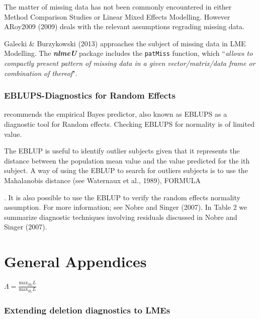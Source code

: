 \documentclass[12pt, a4paper]{report}
\theoremstyle{plain}
\theoremstyle{definition}
\theoremstyle{remark}
\begin{document}
	The matter of missing data has not been commonly encountered in either Method Comparison Studies or Linear Mixed Effects Modelling. However ARoy2009 (2009) deals with the relevant assumptions regrading missing data. 
	
	Galecki \& Burzykowski (2013) approaches the subject of missing data in LME Modelling. The \textbf{\textit{nlmeU}} package includes the \texttt{patMiss} function, which ``\textit{allows to compactly present pattern of missing data in a given vector/matrix/data
		frame or combination of thereof}".
	
	
	
\subsection{EBLUPS-Diagnostics for Random Effects}
\citet{west} recommends the empirical Bayes predictor, also known as EBLUPS as a diagnostic tool for Random effects. Checking EBLUPS for normality is of limited value.




The EBLUP is useful to identify outlier subjects given that it represents the distance
between the population mean value and the value predicted for the ith subject. A way of
using the EBLUP to search for outliers subjects is to use the Mahalanobis distance (see
Waternaux et al., 1989), FORMULA

. It is also possible to use the EBLUP
to verify the random effects normality assumption. For more information; see Nobre and
Singer (2007). In Table 2 we summarize diagnostic techniques involving residuals discussed
in Nobre and Singer (2007).




	\chapter{General Appendices}
	$\Lambda = \frac{\mbox{max}_{H_{0}}L}{\mbox{max}_{H_{1}}L}$
	
	\subsection{Extending deletion diagnostics to LMEs}
	
\end{document}
